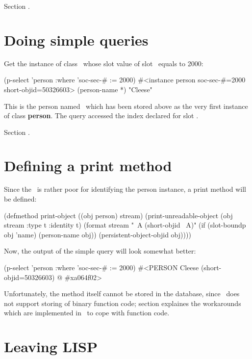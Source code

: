  Section .

\section{Doing simple queries}

Get the instance of class \ whose slot value of slot
\ equals to 2000:
\begin{CompactCode}
\listener{}(p-select 'person :where 'soc-sec-# := 2000)
#<instance person soc-sec-#=2000 short-objid=50326603>
\listener{}(person-name *)
"Cleese"
\end{CompactCode}

This is the person named \ which has been stored above
as the very first instance of class \textbf{person}. The query
accessed the index declared for slot .

 Section .

\section{Defining a print method}

Since the \objid\ is rather poor for identifying the person instance,
a print method will be defined:
\begin{CompactCode}
\listener{}(defmethod print-object ((obj person) stream)
               (print-unreadable-object (obj stream :type t :identity t)
                 (format stream "~A (short-objid ~A)"
                         (if (slot-boundp obj 'name) (person-name obj))
                         (persistent-object-objid obj))))
\end{CompactCode}

Now, the output of the simple query will look somewhat better:
\begin{CompactCode}
\listener{}(p-select 'person :where 'soc-sec-# := 2000)
#<PERSON Cleese (short-objid=50326603) @ #xa064f02>
\end{CompactCode}

Unfortunately, the method itself cannot be stored in the database,
since \plob\ does not support storing of binary function code; section
 explaines the workarounds which are
implemented in \plob\ to cope with function code.

\section{Leaving LISP}

